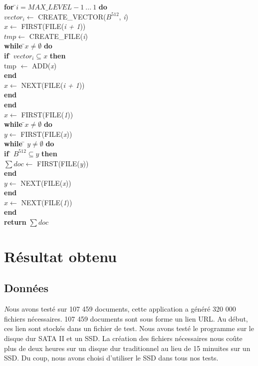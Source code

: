 \begin{flushleft}
\begin{framed}
\begin{tabbing}
			\textbf{for }\=$i = MAX\_LEVEL - 1\ ...\ 1$ \textbf{do}\\
					\> $vector_i \leftarrow$ CREATE\_VECTOR($B^{512}$, \textit{i})\\
					\> $x \leftarrow$ FIRST(FILE(\textit{i + 1}))\\
					\> $tmp \leftarrow$ CREATE\_FILE(\textit{i})\\
					\> \textbf{while }\=$x \neq \emptyset$\textbf{ do}\\
					\> \> \textbf{if }\= $vector_i \subseteq x$\textbf{ then}\\
					\> \> \> tmp $\leftarrow$ ADD(\textit{x})\\
					\> \> \textbf{end}\\
					\> \> $x \leftarrow$ NEXT(FILE(\textit{i + 1}))\\
					\> \textbf{end}\\
			\textbf{end}	\\
			$x \leftarrow$ FIRST(FILE(\textit{1}))\\
			\textbf{while }\=$x \neq \emptyset$\textbf{ do}\\
					\> $y \leftarrow $ FIRST(FILE(\textit{x}))\\
					\> \textbf{while }\= $y \neq \emptyset$\textbf{ do}\\
					\> \> \textbf{if }\= $B^{512} \subseteq y$\textbf{ then}\\
					\> \> \> $\sum doc \leftarrow$ FIRST(FILE(\textit{y}))\\
					\> \> \textbf{end}\\
					\> \> $y \leftarrow$ NEXT(FILE(\textit{x}))\\
					\> \textbf{end}\\
					\> $x \leftarrow$ NEXT(FILE(\textit{1}))\\
			\textbf{end}\\
			\textbf{return} $\sum doc$
	    	\end{tabbing}		
	\end{framed}
\end{flushleft}

\chapter{Résultat obtenu}
\section{Données}
	{\huge \itshape N}ous avons testé sur 107 459 documents, cette application a généré 320 000 fichiers nécessaires. 107 459 documents sont sous forme un lien URL. Au début, ces lien sont stockés dans un fichier de test. Nous avons testé le programme sur le disque dur SATA II et un SSD. La création des fichiers nécessaires nous coûte plus de deux heures sur un disque dur traditionnel au lieu de 15 minuites sur un SSD. Du coup, nous avons choisi d'utiliser le SSD dans tous nos tests.
	
